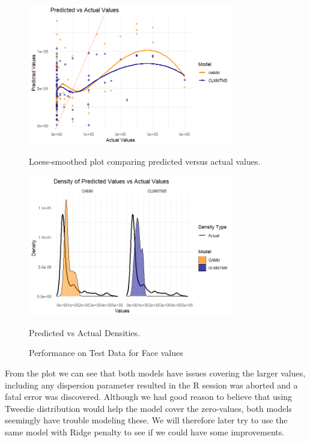 \documentclass[12pt, twoside,hidelinks]{article}
\theoremstyle{definition}
\numberwithin{equation}{section}
\begin{document}
\begin{figure}[H]
\centering

\includegraphics[width=0.8\textwidth]{visuals/InsuranceData/Facepredvact.png}
\caption*{Loess-smoothed plot comparing predicted versus actual values.}
\label{fig:hist_pred_errors}

\includegraphics[width=0.8\textwidth]{visuals/InsuranceData/Facepredvactdens.png}
\caption*{Predicted vs Actual Densities.}
\label{fig:predicted_vs_actual_densities}

\caption{Performance on Test Data for Face values}
\label{fig:test_data_performance_4}
\end{figure}

From the plot we can see that both models have issues covering the larger values, including any dispersion parameter resulted in the R session was aborted and a fatal error was discovered. Although we had good reason to believe that using Tweedie distribution would help the model cover the zero-values, both models seemingly have trouble modeling these. We will therefore later try to use the same model with Ridge penalty to see if we could have some improvements.
\end{document}
